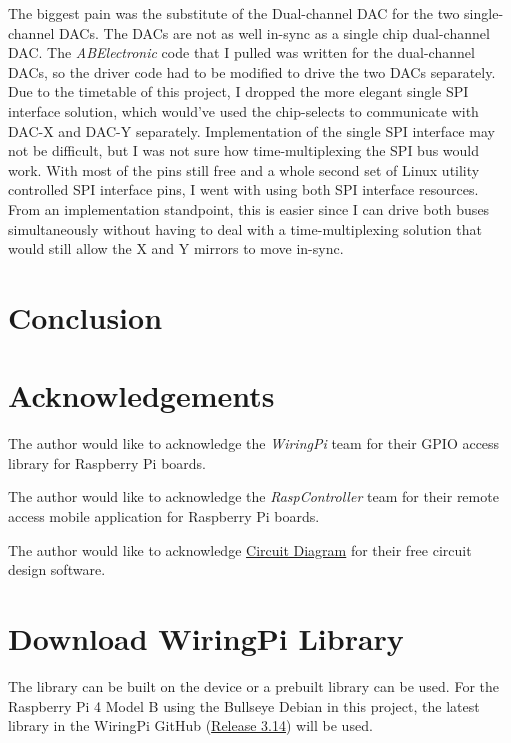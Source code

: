 \documentclass[journal]{IEEEtran}
\begin{document}
    The biggest pain was the substitute of the Dual-channel DAC for the two single-channel DACs. 
    The DACs are not as well in-sync as a single chip dual-channel DAC.
    The \emph{ABElectronic} code that I pulled was written for the dual-channel DACs, so the driver code had to be modified to drive the two DACs separately.
    Due to the timetable of this project, I dropped the more elegant single SPI interface solution, which would've used the chip-selects to communicate with DAC-X and DAC-Y separately.
    Implementation of the single SPI interface may not be difficult, but I was not sure how time-multiplexing the SPI bus would work.
    With most of the pins still free and a whole second set of Linux utility controlled SPI interface pins, I went with using both SPI interface resources.
    From an implementation standpoint, this is easier since I can drive both buses simultaneously without having to deal with a time-multiplexing solution that would still allow the X and Y mirrors to move in-sync.
     

    \section{Conclusion}

    \nocite{*}
    \newpage

    
    

    \newpage
    \section{Acknowledgements}
    The author would like to acknowledge the \emph{WiringPi} team for their GPIO access library for Raspberry Pi boards. \newline

    The author would like to acknowledge the \emph{RaspController} team for their remote access mobile application for Raspberry Pi boards.

    The author would like to acknowledge {\href{https://www.circuit-diagram.org/editor/}{Circuit Diagram}} for their free circuit design software. 

    \newpage
    \appendices
    \section{Download WiringPi Library}
    The library can be built on the device or a prebuilt library can be used. 
    For the Raspberry Pi 4 Model B using the Bullseye Debian in this project, the latest library in the WiringPi GitHub ({\href{https://github.com/WiringPi/WiringPi/releases/tag/3.14}{Release 3.14}}) will be used.
\end{document}

